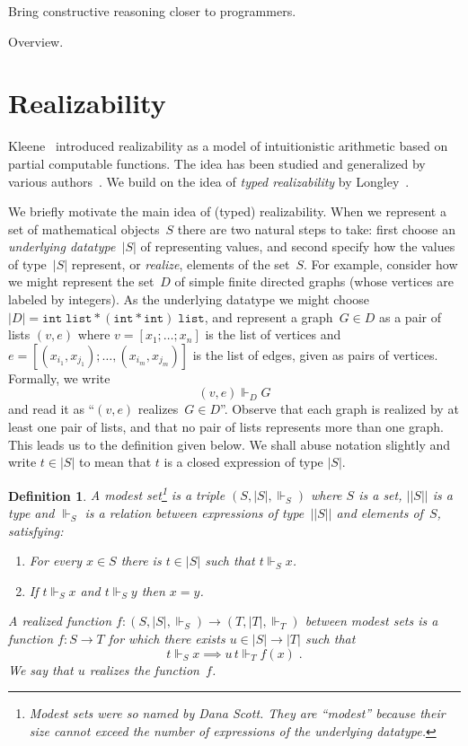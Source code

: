 \documentclass{article}
\newcommand{\ut}[1]{|#1|}
\newcommand{\rz}{\Vdash}
\newtheorem{definition}[theorem]{Definition}
\begin{document}
Bring constructive reasoning closer to programmers.

Overview.

\section{Realizability}
\label{sec:realizability}

Kleene~\cite{KleeneSC:intint} introduced realizability as a model of
intuitionistic arithmetic based on partial computable functions. The
idea has been studied and generalized by various
authors~\cite{TroelstraA:rea,HylandJ:efft,HylandJ:trit,OostenJ:exer}.
We build on the idea of \emph{typed realizability} by
Longley~\cite{Longley00}.

We briefly motivate the main idea of (typed) realizability. When we
represent a set of mathematical objects~$S$ there are two natural
steps to take: first choose an \emph{underlying datatype~$\ut{S}$} of
representing values, and second specify how the values of
type~$\ut{S}$ represent, or \emph{realize}, elements of the set~$S$.
For example, consider how we might represent the set~$D$ of simple
finite directed graphs (whose vertices are labeled by integers). As
the underlying datatype we might choose $\ut{D} = \mathtt{int} \;
\mathtt{list} * (\mathtt{int} * \mathtt{int}) \; \mathtt{list}$, and
represent a graph~$G \in D$ as a pair of lists $(v,e)$ where $v =
[x_1; \ldots; x_n]$ is the list of vertices and $e = [(x_{i_1},
x_{j_1}); \ldots, (x_{i_m}, x_{j_m})]$ is the list of edges, given as
pairs of vertices. Formally, we write
%
\begin{equation*}
  (v, e) \rz_D G
\end{equation*}
%
and read it as ``$(v,e)$ realizes~$G \in D$''. Observe that each graph
is realized by at least one pair of lists, and that no pair of lists
represents more than one graph. This leads us to the definition given
below. We shall abuse notation slightly and write $t \in \ut{S}$ to
mean that $t$ is a closed expression of type $\ut{S}$.

\begin{definition}
  A \emph{modest set}\footnote{Modest sets were so named by Dana
    Scott. They are ``modest'' because their size cannot exceed the
    number of expressions of the underlying datatype.} is a triple
  $(S, \ut{S}, {\rz_S})$ where $S$ is a set, $\ut{|S|}$ is a type and
  $\rz_S$ is a relation between expressions of type~$\ut{|S|}$ and
  elements of~$S$, satisfying:
  \begin{enumerate}
  \item For every $x \in S$ there is $t \in \ut{S}$ such that $t \rz_S
    x$.
  \item If $t \rz_S x$ and $t \rz_S y$ then $x = y$.
  \end{enumerate}
  A \emph{realized function} $f : (S, \ut{S}, {\rz_S}) \to (T, \ut{T},
  {\rz_T})$ between modest sets is a function $f : S \to T$ for which
  there exists $u \in \ut{S} \to \ut{T}$ such that
  \begin{equation*}
    t \rz_S x \implies u\,t \rz_T f(x) \;.
  \end{equation*}
  We say that $u$ \emph{realizes} the function~$f$.
\end{definition}
\end{document}

